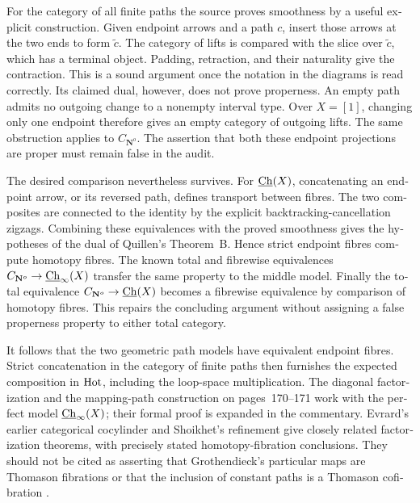 \begin{otherlanguage}{english}
For the category of all finite paths the source proves smoothness by a useful
explicit construction.  Given endpoint arrows and a path $c$, insert those
arrows at the two ends to form $\widetilde c$.  The category of lifts is
compared with the slice over $\widetilde c$, which has a terminal object.
Padding, retraction, and their naturality give the contraction.  This is a
sound argument once the notation in the diagrams is read correctly.  Its
claimed dual, however, does not prove properness.  An empty path admits no
outgoing change to a nonempty interval type.  Over $X=[1]$, changing only one
endpoint therefore gives an empty category of outgoing lifts.  The same
obstruction applies to $C_{\mathbf N^o}$.  The assertion that both these
endpoint projections are proper must remain false in the audit.

The desired comparison nevertheless survives.  For $\underline{\mathrm{Ch}}(X)$, concatenating an
endpoint arrow, or its reversed path, defines transport between fibres.
The two composites are connected to the identity by the explicit
backtracking-cancellation zigzags.  Combining these equivalences with the
proved smoothness gives the hypotheses of the dual of Quillen's Theorem~B.
Hence strict endpoint fibres compute homotopy fibres.  The known total and
fibrewise equivalences
$C_{\mathbf N^o}\to\underline{\mathrm{Ch}}_\infty(X)$ transfer the same property to the middle
model.  Finally the total equivalence
$C_{\mathbf N^o}\to\underline{\mathrm{Ch}}(X)$ becomes a fibrewise equivalence by comparison of
homotopy fibres.  This repairs the concluding argument without assigning a
false properness property to either total category.

It follows that the two geometric path models have equivalent endpoint
fibres.  Strict concatenation in the category of finite paths then furnishes
the expected composition in $\mathrm{Hot}$, including the loop-space multiplication.
The diagonal factorization and the mapping-path construction on pages~170--171
work with the perfect model $\underline{\mathrm{Ch}}_\infty(X)$; their formal proof is expanded in
the commentary.  Evrard's earlier categorical cocylinder and Shoikhet's
refinement give closely related factorization theorems, with precisely stated
homotopy-fibration conclusions.  They should not be cited as asserting that
Grothendieck's particular maps are Thomason fibrations or that the inclusion
of constant paths is a Thomason cofibration \citep{Evrard1975,Shoikhet2016}.


\end{otherlanguage}
